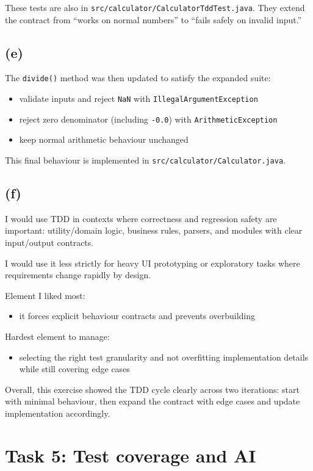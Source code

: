 These tests are also in \texttt{src/calculator/CalculatorTddTest.java}. They extend the contract from ``works on normal numbers'' to ``fails safely on invalid input.''

\subsection{(e)}
The \texttt{divide()} method was then updated to satisfy the expanded suite:
\begin{itemize}
    \item validate inputs and reject \texttt{NaN} with \texttt{IllegalArgumentException}
    \item reject zero denominator (including \texttt{-0.0}) with \texttt{ArithmeticException}
    \item keep normal arithmetic behaviour unchanged
\end{itemize}

This final behaviour is implemented in \texttt{src/calculator/Calculator.java}.

\subsection{(f)}
I would use TDD in contexts where correctness and regression safety are important: utility/domain logic, business rules, parsers, and modules with clear input/output contracts.

I would use it less strictly for heavy UI prototyping or exploratory tasks where requirements change rapidly by design.

Element I liked most:
\begin{itemize}
    \item it forces explicit behaviour contracts and prevents overbuilding
\end{itemize}

Hardest element to manage:
\begin{itemize}
    \item selecting the right test granularity and not overfitting implementation details while still covering edge cases
\end{itemize}

Overall, this exercise showed the TDD cycle clearly across two iterations: start with minimal behaviour, then expand the contract with edge cases and update implementation accordingly.

\section{Task 5:  Test coverage and AI}

